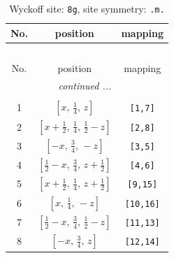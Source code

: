 \documentclass[fleqn,8pt]{jsarticle}
\begin{document}
\begin{longtable}{ccc}
\caption{Wyckoff site: {\tt 8g}, site symmetry: {\tt .m.}}
 \\
 \hline \hline
No. & position & mapping \\ \hline \endfirsthead

\multicolumn{2}{l}{\tablename\ \thetable{}} \\
 \hline \hline
No. & position & mapping \\ \hline \endhead

 \hline \hline
\multicolumn{2}{r}{\footnotesize\it continued ...} \\ \endfoot

 \hline \hline
\multicolumn{2}{r}{} \\ \endlastfoot

1 & $\left[ x,\, \frac{1}{4},\, z \right]$ & {\tt [1,7]} \\ \hline
2 & $\left[ x + \frac{1}{2},\, \frac{1}{4},\, \frac{1}{2} - z \right]$ & {\tt [2,8]} \\ \hline
3 & $\left[ - x,\, \frac{3}{4},\, - z \right]$ & {\tt [3,5]} \\ \hline
4 & $\left[ \frac{1}{2} - x,\, \frac{3}{4},\, z + \frac{1}{2} \right]$ & {\tt [4,6]} \\ \hline
5 & $\left[ x + \frac{1}{2},\, \frac{1}{4},\, z + \frac{1}{2} \right]$ & {\tt [9,15]} \\ \hline
6 & $\left[ x,\, \frac{1}{4},\, - z \right]$ & {\tt [10,16]} \\ \hline
7 & $\left[ \frac{1}{2} - x,\, \frac{3}{4},\, \frac{1}{2} - z \right]$ & {\tt [11,13]} \\ \hline
8 & $\left[ - x,\, \frac{3}{4},\, z \right]$ & {\tt [12,14]} \\
\end{longtable}
\renewcommand{\arraystretch}{1.2}
\end{document}
